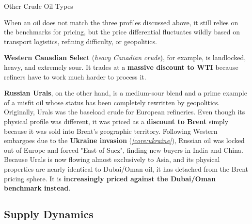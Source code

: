 \documentclass[10pt]{article}
\begin{document}
      \begin{core}{Other Crude Oil Types}

        When an oil does not match the three profiles discussed above, it still relies on the benchmarks for pricing, but the price differential fluctuates wildly based on transport logistics, refining difficulty, or geopolitics.

        \textbf{Western Canadian Select} (\textit{heavy Canadian crude}), for example, is landlocked, heavy, and extremely sour. It trades at a \textbf{massive discount to WTI} because refiners have to work much harder to process it. 

        \textbf{Russian Urals}, on the other hand, is a medium-sour blend and a prime example of a misfit oil whose status has been completely rewritten by geopolitics. Originally, Urals was the baseload crude for European refineries. Even though its physical profile was different, it was priced as a \textbf{discount to Brent} simply because it was sold into Brent's geographic territory. Following Western embargoes due to the \textbf{Ukraine invasion} (\textit{\autoref{core:ukraine}}), Russian oil was locked out of Europe and forced "East of Suez", finding new buyers in India and China. Because Urals is now flowing almost exclusively to Asia, and its physical properties are nearly identical to Dubai/Oman oil, it has detached from the Brent pricing sphere. It is \textbf{increasingly priced against the Dubai/Oman benchmark instead}.

      \end{core}

  \subsection{Supply Dynamics}
\end{document}
